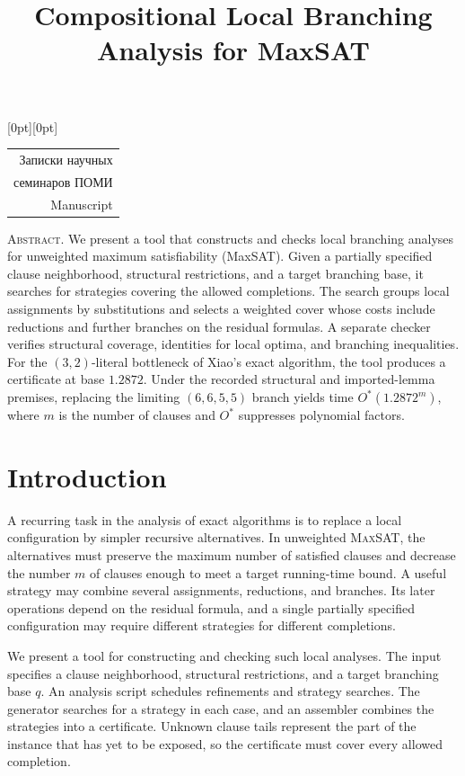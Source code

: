 \documentclass[10pt,twoside]{article}
\title{Compositional Local Branching Analysis for MaxSAT}
\date{}
\makeatletter
\newcommand{\MaxSAT}{\textnormal{\textsc{MaxSAT}}}
\newcommand{\OhStar}{O^*}
\theoremstyle{definition}
\theoremstyle{remark}
\renewcommand{\maketitle}{%
  \thispagestyle{plain}%
  \noindent\hfill\raisebox{0pt}[0pt][0pt]{%
    \begin{tabular}[b]{@{}r@{}}\footnotesize
      {\fontencoding{T2A}\selectfont Записки научных}\\[-1pt]
      {\fontencoding{T2A}\selectfont семинаров ПОМИ}\\[-1pt]
      Manuscript
    \end{tabular}}%
  \par\vspace{1.2em}%
  {\raggedright
    \ifx\@author\@empty\else
      \noindent\hspace*{\parindent}\textbf{\@author}\par\smallskip
    \fi
    \noindent\hspace*{\parindent}\parbox[t]{0.88\linewidth}{%
      \raggedright\bfseries\MakeUppercase{\@title}}\par}%
  \medskip
}
\renewenvironment{abstract}
  {\footnotesize\list{}{\setlength{\leftmargin}{3pc}\setlength{\rightmargin}{3pc}}%
   \item\relax\textsc{Abstract.}\enspace}
  {\endlist}
\makeatother
\begin{document}
\maketitle

\begin{abstract}
We present a tool that constructs and checks local branching analyses for
unweighted maximum satisfiability (MaxSAT). Given a partially specified
clause neighborhood, structural restrictions, and a target branching base,
it searches for strategies covering the allowed completions. The search
groups local assignments by substitutions and selects a weighted cover
whose costs include reductions and further branches on the residual
formulas. A separate checker verifies structural coverage, identities for
local optima, and branching inequalities. For the $(3,2)$-literal
bottleneck of Xiao's exact algorithm, the tool produces a certificate
at base $1.2872$. Under the recorded structural and imported-lemma premises,
replacing the limiting $(6,6,5,5)$ branch yields time $\OhStar(1.2872^m)$,
where $m$ is the number of clauses and $\OhStar$ suppresses polynomial factors.
\end{abstract}

\begin{NoHyper}
\renewcommand{\thefootnote}{}
\end{NoHyper}

\section{Introduction}
\label{sec:introduction}

A recurring task in the analysis of exact algorithms is to replace a
local configuration by simpler recursive alternatives. In unweighted
\MaxSAT{}, the alternatives must preserve the maximum number of satisfied
clauses and decrease the number $m$ of clauses enough to meet a target
running-time bound. A useful strategy may combine several assignments,
reductions, and branches. Its later operations depend on the residual
formula, and a single partially specified configuration may require
different strategies for different completions.

We present a tool for constructing and checking such local analyses.
The input specifies a clause neighborhood, structural restrictions,
and a target branching base $q$. An analysis script schedules refinements
and strategy searches. The generator searches for a strategy in each case,
and an assembler combines the strategies into a certificate.
Unknown clause tails represent the part of the instance that has yet to
be exposed, so the certificate must cover every allowed completion.
\end{document}
